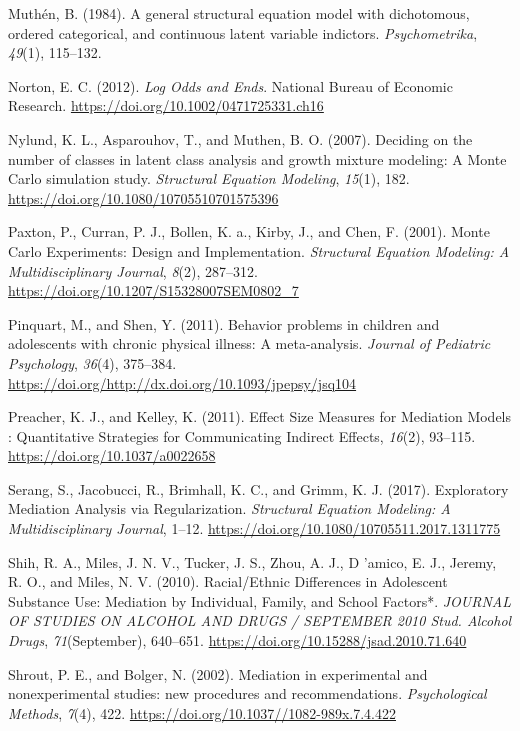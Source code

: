 \documentclass[]{DissertateUSU}
\begin{document}
\hypertarget{ref-Muthen1984}{}
Muthén, B. (1984). A general structural equation model with dichotomous,
ordered categorical, and continuous latent variable indictors.
\emph{Psychometrika}, \emph{49}(1), 115--132.

\hypertarget{ref-Norton2012}{}
Norton, E. C. (2012). \emph{Log Odds and Ends}. National Bureau of
Economic Research. \url{https://doi.org/10.1002/0471725331.ch16}

\hypertarget{ref-Nylund2007}{}
Nylund, K. L., Asparouhov, T., and Muthen, B. O. (2007). Deciding on the
number of classes in latent class analysis and growth mixture modeling:
A Monte Carlo simulation study. \emph{Structural Equation Modeling},
\emph{15}(1), 182. \url{https://doi.org/10.1080/10705510701575396}

\hypertarget{ref-Paxton2001}{}
Paxton, P., Curran, P. J., Bollen, K. a., Kirby, J., and Chen, F.
(2001). Monte Carlo Experiments: Design and Implementation.
\emph{Structural Equation Modeling: A Multidisciplinary Journal},
\emph{8}(2), 287--312. \url{https://doi.org/10.1207/S15328007SEM0802_7}

\hypertarget{ref-Pinquart2011}{}
Pinquart, M., and Shen, Y. (2011). Behavior problems in children and
adolescents with chronic physical illness: A meta-analysis.
\emph{Journal of Pediatric Psychology}, \emph{36}(4), 375--384.
\url{https://doi.org/http://dx.doi.org/10.1093/jpepsy/jsq104}

\hypertarget{ref-Preacher2011}{}
Preacher, K. J., and Kelley, K. (2011). Effect Size Measures for
Mediation Models : Quantitative Strategies for Communicating Indirect
Effects, \emph{16}(2), 93--115. \url{https://doi.org/10.1037/a0022658}

\hypertarget{ref-Serang2017}{}
Serang, S., Jacobucci, R., Brimhall, K. C., and Grimm, K. J. (2017).
Exploratory Mediation Analysis via Regularization. \emph{Structural
Equation Modeling: A Multidisciplinary Journal}, 1--12.
\url{https://doi.org/10.1080/10705511.2017.1311775}

\hypertarget{ref-Shih2010}{}
Shih, R. A., Miles, J. N. V., Tucker, J. S., Zhou, A. J., D 'amico, E.
J., Jeremy, R. O., and Miles, N. V. (2010). Racial/Ethnic Differences in
Adolescent Substance Use: Mediation by Individual, Family, and School
Factors*. \emph{JOURNAL OF STUDIES ON ALCOHOL AND DRUGS / SEPTEMBER 2010
Stud. Alcohol Drugs}, \emph{71}(September), 640--651.
\url{https://doi.org/10.15288/jsad.2010.71.640}

\hypertarget{ref-Shrout2002}{}
Shrout, P. E., and Bolger, N. (2002). Mediation in experimental and
nonexperimental studies: new procedures and recommendations.
\emph{Psychological Methods}, \emph{7}(4), 422.
\url{https://doi.org/10.1037//1082-989x.7.4.422}
\end{document}
